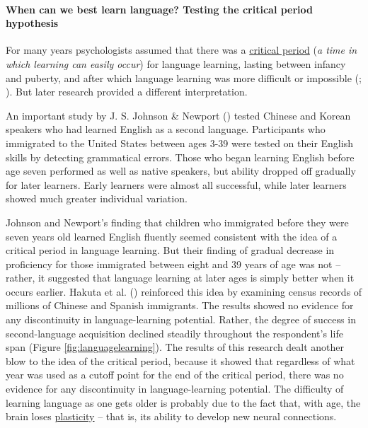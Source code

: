 \documentclass[
]{krantz}
\begin{document}
\paragraph*{When can we best learn language? Testing the critical period hypothesis}\label{when-can-we-best-learn-language-testing-the-critical-period-hypothesis}

For many years psychologists assumed that there was a \hyperref[critical-period]{critical period} (\emph{a time in which learning can easily occur}) for language learning, lasting between infancy and puberty, and after which language learning was more difficult or impossible (; ). But later research provided a different interpretation.

An important study by J. S. Johnson \& Newport () tested Chinese and Korean speakers who had learned English as a second language. Participants who immigrated to the United States between ages 3-39 were tested on their English skills by detecting grammatical errors. Those who began learning English before age seven performed as well as native speakers, but ability dropped off gradually for later learners. Early learners were almost all successful, while later learners showed much greater individual variation.

Johnson and Newport's finding that children who immigrated before they were seven years old learned English fluently seemed consistent with the idea of a critical period in language learning. But their finding of gradual decrease in proficiency for those immigrated between eight and 39 years of age was not -- rather, it suggested that language learning at later ages is simply better when it occurs earlier. Hakuta et al. () reinforced this idea by examining census records of millions of Chinese and Spanish immigrants. The results showed no evidence for any discontinuity in language-learning potential. Rather, the degree of success in second-language acquisition declined steadily throughout the respondent's life span (Figure \ref{fig:languagelearning}). The results of this research dealt another blow to the idea of the critical period, because it showed that regardless of what year was used as a cutoff point for the end of the critical period, there was no evidence for any discontinuity in language-learning potential. The difficulty of learning language as one gets older is probably due to the fact that, with age, the brain loses \hyperref[plasticity]{plasticity} -- that is, its ability to develop new neural connections.
\end{document}
